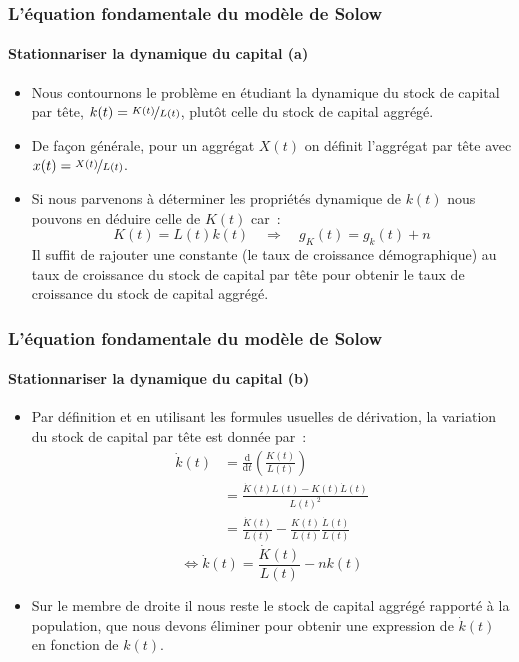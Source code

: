 \documentclass[10pt,notheorems]{beamer}
\theoremstyle{plain}
\theoremstyle{definition} %
\begin{document}
\begin{frame}
  \frametitle{L'équation fondamentale du modèle de Solow}
  \framesubtitle{Stationnariser la dynamique du capital (a)}

  \bigskip

  \begin{itemize}

  \item Nous contournons le problème en étudiant la dynamique du stock de capital par tête, $k(t)=\nicefrac{K(t)}{L(t)}$, plutôt celle du stock de capital aggrégé.\newline

  \item De façon générale, pour un aggrégat $X(t)$ on définit l'aggrégat par tête avec $x(t) = \nicefrac{X(t)}{L(t)}$.\newline

  \item Si nous parvenons à déterminer les propriétés dynamique de $k(t)$ nous pouvons en déduire celle de $K(t)$ car~:
    \[
      K(t) = L(t)k(t) \quad\Rightarrow\quad g_K(t) = g_k(t) + n
    \]
    Il suffit de rajouter une constante (le taux de croissance démographique) au taux de croissance du stock de capital par tête pour obtenir le taux de croissance du stock de capital aggrégé.

  \end{itemize}

\end{frame}


\begin{frame}
  \frametitle{L'équation fondamentale du modèle de Solow}
  \framesubtitle{Stationnariser la dynamique du capital (b)}

  \bigskip

  \begin{itemize}

  \item Par définition et en utilisant les formules usuelles de dérivation, la variation du stock de capital par tête est donnée par~:
    \[
      \begin{split}
        \dot k(t) &= \frac{\mathrm d}{\mathrm dt}\left(\frac{K(t)}{L(t)}\right)\\
        &= \frac{\dot K(t)L(t)-K(t)\dot L(t)}{L(t)^2}\\
        &= \frac{\dot K(t)}{L(t)}-\frac{K(t)}{L(t)}\frac{\dot L(t)}{L(t)}
      \end{split}
    \]
    \[
      \Leftrightarrow\dot k(t) = \frac{\dot K(t)}{L(t)} - nk(t)
    \]

    \bigskip

  \item Sur le membre de droite il nous reste le stock de capital aggrégé rapporté à la population, que nous devons éliminer pour obtenir une expression de $\dot k(t)$ en fonction de $k(t)$.

  \end{itemize}

\end{frame}
\end{document}
